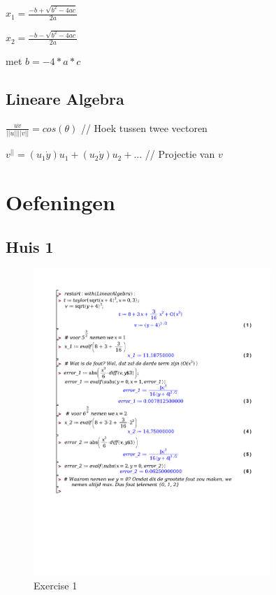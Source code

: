 \documentclass[a4paper]{article}
\begin{document}
$x_1 = \frac{-b + \sqrt{b^2 - 4ac}}{2a}$

$x_2 = \frac{-b - \sqrt{b^2 - 4ac}}{2a}$

met $b = -4*a*c$

\subsection*{Lineare Algebra}

$\frac{u\dot v}{||u|| ||v||} = cos(\theta)$ // Hoek tussen twee vectoren

$v^{||} = (u_1 \dot y) u_1 + (u_2 \dot y) u_2 + ...$ // Projectie van $v$


\section*{Oefeningen}

\subsection*{Huis 1}

\begin{figure}[!htbp]
	\centering
	\includegraphics[width=0.8\textwidth]{./exercises/huis_1_ex_1.pdf}
	\caption{Exercise 1}
\end{figure}
\end{document}
